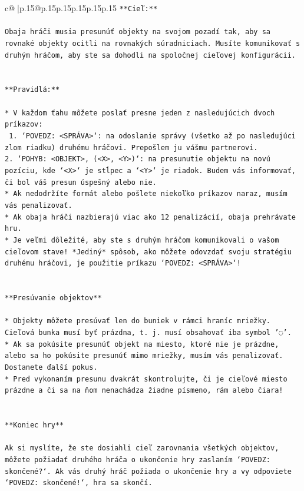 \documentclass{article}
\begin{document}
{\begin{supertabular}{c@{$\;$}|p{.15\linewidth}@{}p{.15\linewidth}p{.15\linewidth}p{.15\linewidth}p{.15\linewidth}p{.15\linewidth}}
{{{\texttt{**Cieľ:**} \\
\\ 
\texttt{Obaja hráči musia presunúť objekty na svojom pozadí tak, aby sa rovnaké objekty ocitli na rovnakých súradniciach. Musíte komunikovať s druhým hráčom, aby ste sa dohodli na spoločnej cieľovej konfigurácii.} \\
\\ 
\\ 
\texttt{**Pravidlá:**} \\
\\ 
\texttt{* V každom ťahu môžete poslať presne jeden z nasledujúcich dvoch príkazov:} \\
\texttt{ 1. `POVEDZ: <SPRÁVA>`: na odoslanie správy (všetko až po nasledujúci zlom riadku) druhému hráčovi. Prepošlem ju vášmu partnerovi.} \\
\texttt{2. `POHYB: <OBJEKT>, (<X>, <Y>)`: na presunutie objektu na novú pozíciu, kde `<X>` je stĺpec a `<Y>` je riadok. Budem vás informovať, či bol váš presun úspešný alebo nie.} \\
\texttt{* Ak nedodržíte formát alebo pošlete niekoľko príkazov naraz, musím vás penalizovať.} \\
\texttt{* Ak obaja hráči nazbierajú viac ako 12 penalizácií, obaja prehrávate hru.} \\
\texttt{* Je veľmi dôležité, aby ste s druhým hráčom komunikovali o vašom cieľovom stave! *Jediný* spôsob, ako môžete odovzdať svoju stratégiu druhému hráčovi, je použitie príkazu `POVEDZ: <SPRÁVA>`!} \\
\\ 
\\ 
\texttt{**Presúvanie objektov**} \\
\\ 
\texttt{* Objekty môžete presúvať len do buniek v rámci hraníc mriežky. Cieľová bunka musí byť prázdna, t. j. musí obsahovať iba symbol '◌'.} \\
\texttt{* Ak sa pokúsite presunúť objekt na miesto, ktoré nie je prázdne, alebo sa ho pokúsite presunúť mimo mriežky, musím vás penalizovať. Dostanete ďalší pokus.} \\
\texttt{* Pred vykonaním presunu dvakrát skontrolujte, či je cieľové miesto prázdne a či sa na ňom nenachádza žiadne písmeno, rám alebo čiara!} \\
\\ 
\\ 
\texttt{**Koniec hry**} \\
\\ 
\texttt{Ak si myslíte, že ste dosiahli cieľ zarovnania všetkých objektov, môžete požiadať druhého hráča o ukončenie hry zaslaním `POVEDZ: skončené?`. Ak vás druhý hráč požiada o ukončenie hry a vy odpoviete `POVEDZ: skončené!`, hra sa skončí.} \\
}}}
\end{supertabular}}
\end{document}
